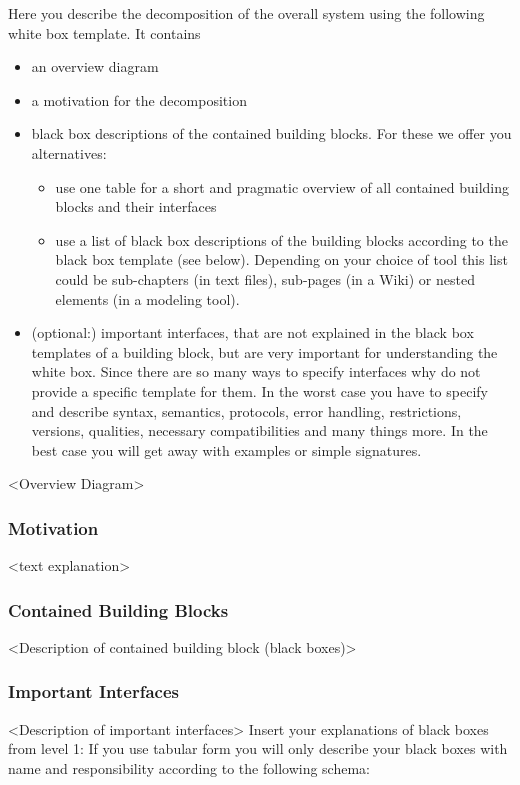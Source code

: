 Here you describe the decomposition of the overall system using the following white box template. It contains
\begin{itemize}
  \item an overview diagram
  \item a motivation for the decomposition
  \item black box descriptions of the contained building blocks. For these we offer you alternatives:
    \begin{itemize}
      \item use one table for a short and pragmatic overview of all contained building blocks and their interfaces
      \item use a list of black box descriptions of the building blocks according to the black box template (see below). Depending on your choice of tool this list could be sub-chapters (in text files), sub-pages (in a Wiki) or nested elements (in a modeling tool).
    \end{itemize}
  \item (optional:) important interfaces, that are not explained in the black box templates of a building block, but are very important for understanding the white box. Since there are so many ways to specify interfaces why do not provide a specific template for them. In the worst case you have to specify and describe syntax, semantics, protocols, error handling, restrictions, versions, qualities, necessary compatibilities and many things more. In the best case you will get away with examples or simple signatures.
\end{itemize}

\textless Overview Diagram\textgreater

\subsubsection*{Motivation}
\textless text explanation\textgreater

\subsubsection*{Contained Building Blocks}
\textless Description of contained building block (black boxes)\textgreater

\subsubsection*{Important Interfaces}
\textless Description of important interfaces\textgreater
Insert your explanations of black boxes from level 1:
If you use tabular form you will only describe your black boxes with name and responsibility according to the following schema:

